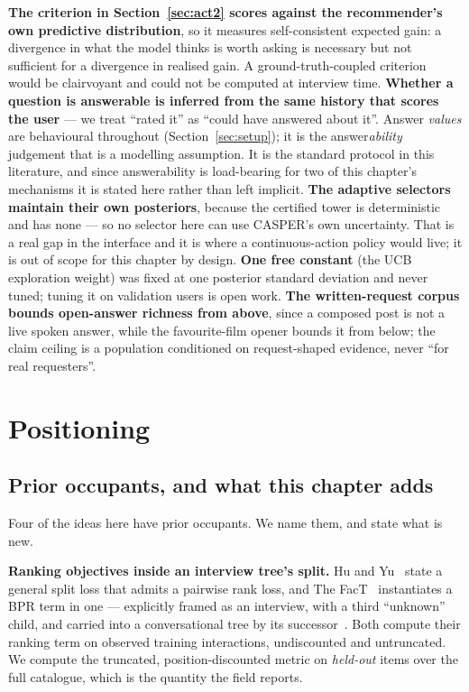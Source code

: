\documentclass[11pt]{article}
\begin{document}
\textbf{The criterion in Section~\ref{sec:act2} scores against the recommender's own predictive
distribution}, so it measures self-consistent expected gain: a divergence in what the model thinks
is worth asking is necessary but not sufficient for a divergence in realised gain. A ground-truth-coupled
criterion would be clairvoyant and could not be computed at interview time.
\textbf{Whether a question is answerable is inferred from the same history that scores the user}
--- we treat ``rated it'' as ``could have answered about it''. Answer \emph{values} are behavioural
throughout (Section~\ref{sec:setup}); it is the answer\emph{ability} judgement that is a modelling
assumption. It is the standard protocol in this literature, and since answerability is load-bearing
for two of this chapter's mechanisms it is stated here rather than left implicit.
\textbf{The adaptive selectors maintain their own posteriors}, because the certified tower is
deterministic and has none --- so no selector here can use CASPER's own uncertainty. That
is a real gap in the interface and it is where a continuous-action policy would live; it is out of
scope for this chapter by design.
\textbf{One free constant} (the UCB exploration weight) was fixed at one posterior standard
deviation and never tuned; tuning it on validation users is open work.
\textbf{The written-request corpus bounds open-answer richness from above}, since a composed post
is not a live spoken answer, while the favourite-film opener bounds it from below; the claim ceiling
is a population conditioned on request-shaped evidence, never ``for real requesters''.

\section{Positioning}
\label{sec:positioning}

\subsection{Prior occupants, and what this chapter adds}

Four of the ideas here have prior occupants. We name them, and state what is new.

\textbf{Ranking objectives inside an interview tree's split.} Hu and
Yu~\cite{hu2013interview} state a general split loss that admits a pairwise rank loss, and The
FacT~\cite{tao2019fact} instantiates a BPR term in one --- explicitly framed as an interview, with a
third ``unknown'' child, and carried into a conversational tree by its
successor~\cite{haque2022factcrs}. Both compute their ranking term on observed training interactions,
undiscounted and untruncated. We compute the truncated, position-discounted metric on \emph{held-out}
items over the full catalogue, which is the quantity the field reports.
\end{document}
